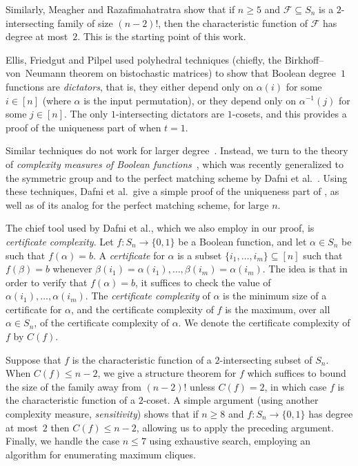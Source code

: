 \documentclass{article}
\theoremstyle{definition}
\begin{document}
Similarly, Meagher and Razafimahatratra show that if $n \geq 5$ and $\mathcal{F} \subseteq S_n$ is a $2$-intersecting family of size $(n-2)!$, then the characteristic function of $\mathcal{F}$ has degree at most~$2$. This is the starting point of this work.

Ellis, Friedgut and Pilpel used polyhedral techniques (chiefly, the Birkhoff--von~Neumann theorem on bistochastic matrices) to show that Boolean degree~$1$ functions are \emph{dictators}, that is, they either depend only on $\alpha(i)$ for some $i \in [n]$ (where $\alpha$ is the input permutation), or they depend only on $\alpha^{-1}(j)$ for some $j \in [n]$. The only $1$-intersecting dictators are $1$-cosets, and this provides a proof of the uniqueness part of  when $t = 1$.

Similar techniques do not work for larger degree~\cite{FilmusComment}.
Instead, we turn to the theory of \emph{complexity measures of Boolean functions}~\cite{BuhrmandeWolf}, which was recently generalized to the symmetric group and to the perfect matching scheme by Dafni et al.~\cite{DFLLV}. Using these techniques, Dafni et al.\ give a simple proof of the uniqueness part of , as well as of its analog for the perfect matching scheme, for large $n$.

The chief tool used by Dafni et al., which we also employ in our proof, is \emph{certificate complexity}. Let $f\colon S_n \to \{0,1\}$ be a Boolean function, and let $\alpha \in S_n$ be such that $f(\alpha) = b$. A \emph{certificate} for $\alpha$ is a subset $\{i_1,\ldots,i_m\} \subseteq [n]$ such that $f(\beta) = b$ whenever $\beta(i_1) = \alpha(i_1),\ldots,\beta(i_m) = \alpha(i_m)$. The idea is that in order to verify that $f(\alpha) = b$, it suffices to check the value of $\alpha(i_1),\ldots,\alpha(i_m)$. The \emph{certificate complexity} of $\alpha$ is the minimum size of a certificate for $\alpha$, and the certificate complexity of $f$ is the maximum, over all $\alpha \in S_n$, of the certificate complexity of $\alpha$. We denote the certificate complexity of $f$ by $C(f)$.

Suppose that $f$ is the characteristic function of a $2$-intersecting subset of $S_n$. When $C(f) \leq n-2$, we give a structure theorem for $f$ which suffices to bound the size of the family away from $(n-2)!$ unless $C(f) = 2$, in which case $f$ is the characteristic function of a $2$-coset. A simple argument (using another complexity measure, \emph{sensitivity}) shows that if $n \geq 8$ and $f\colon S_n \to \{0,1\}$ has degree at most~$2$ then $C(f) \leq n-2$, allowing us to apply the preceding argument. Finally, we handle the case $n \le 7$ using exhaustive search, employing an algorithm for enumerating maximum cliques.
\end{document}
